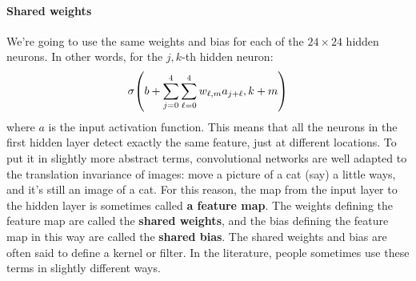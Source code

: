 \documentclass[12pt, letterpaper]{article}
\theoremstyle{definition}
\DeclarePairedDelimiter\autobracket{(}{)}
\newcommand{\br}[1]{\autobracket*{#1}}
\let\tb\textbf
\begin{document}
\paragraph{\tb{Shared weights}} We're going to use the same weights and bias for each of the $24\times24$ hidden neurons. In other words, for the $j,k$-th hidden neuron:
\begin{equation}
\sigma \br{b+\sum_{j=0}^4\sum_{\ell=0}^4 w_{\ell, m} a_{j+\ell}, k+m}
\label{eq1:CNN}
\end{equation}
where $a$ is the input activation function. This means that all the neurons in the first hidden layer detect exactly the same feature, just at different locations. To put it in slightly more abstract terms, convolutional networks are well adapted to the translation invariance of images: move a picture of a cat (say) a little ways, and it's still an image of a cat. For this reason, the map from the input layer to the hidden layer is sometimes called \tb{a feature map}. The weights defining the feature map are called the \tb{shared weights}, and the bias defining the feature map in this way are called the \tb{shared bias}. The shared weights and bias are often said to define a kernel or filter. In the literature, people sometimes use these terms in slightly different ways.
\end{document}
